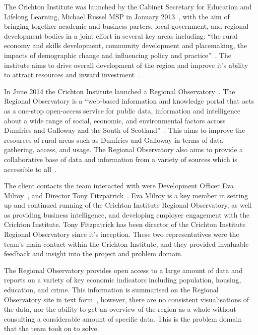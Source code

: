 \documentclass{l3proj}
\begin{document}

The Crichton Institute was launched by the Cabinet Secretary for Education and Lifelong Learning, Michael Russel MSP in January 2013~\cite{CrichtonInsituteFounded}, with the aim of bringing together academic and business parters, local government, and regional development bodies in a joint effort in several key areas including: ``the rural economy and skills development, community development and placemaking, the impacts of demographic change and influencing policy and practice''~\cite{CrichtonInsituteCoreAims}. The institute aims to drive overall development of the region and improve it's ability to attract resources and inward investment~\cite{CrichtonInstituteAboutUs}.

In June 2014 the Crichton Institute launched a Regional Observatory~\cite{CrichtonInstituteRegionalObservatory}. The Regional Observatory is a ``web-based information and knowledge portal that acts as a one-stop open-access service for public data, information and intelligence about a wide range of social, economic, and environmental factors across Dumfries and Galloway and the South of Scotland''~\cite{ScotGovOpenDataResourcePack}. This aims to improve the resources of rural areas such as Dumfries and Galloway in terms of data gathering, access, and usage. The Regional Observatory also aims to provide a collaborative base of data and information from a variety of sources which is accessible to all~\cite{ScotGovOpenDataResourcePack}.

The client contacts the team interacted with were Development Officer Eva Milroy~\cite{EvaMilroyLinkedIn}, and Director Tony Fitzpatrick~\cite{TonyFitzpatrickLinkedIn}. Eva Milroy is a key member in setting up and continued running of the Crichton Institute Regional Observatory, as well as providing business intelligence, and developing employer engagement with the Crichton Institute. Tony Fitzpatrick has been director of the Crichton Institute Regional Observatory since it's inception. These two representatives were the team's main contact within the Crichton Institute, and they provided invaluable feedback and insight into the project and problem domain.


The Regional Observatory provides open access to a large amount of data and reports on a variety of key economic indicators including population, housing, education, and crime. This information is summarised on the Regional Observatory site in text form~\cite{PopulationHealthReport}, however, there are no consistent visualisations of the data, nor the ability to get an overview of the region as a whole without consulting a considerable amount of specific data. This is the problem domain that the team took on to solve.
\end{document}
